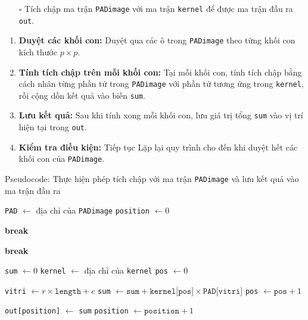 \documentclass{article}
\begin{document}
\begin{itemize}
	\item [$\square$] Tích chập ma trận \texttt{PADimage} với ma trận \texttt{kernel} để được ma trận đầu ra \texttt{out}.
\end{itemize}
\begin{enumerate}
	\item \textbf{Duyệt các khối con:} Duyệt qua các ô trong \texttt{PADimage} theo từng khối con kích thước $p \times p$.
	\item \textbf{Tính tích chập trên mỗi khối con:} Tại mỗi khối con, tính tích chập bằng cách nhân từng phần tử trong \texttt{PADimage} với phần tử tương ứng trong \texttt{kernel}, rồi cộng dồn kết quả vào biến \texttt{sum}.
	\item \textbf{Lưu kết quả:} Sau khi tính xong mỗi khối con, lưu giá trị tổng \texttt{sum} vào vị trí hiện tại trong \texttt{out}. 
	\item \textbf{Kiểm tra điều kiện:} Tiếp tục Lặp lại quy trình cho đến khi duyệt hết các khối con của \texttt{PADimage}.
\end{enumerate}
\begin{algorithm}
	\caption{Pseudocode: Thực hiện phép tích chập với ma trận \texttt{PADimage} và lưu kết quả vào ma trận đầu ra}
	\begin{algorithmic}[1]
		\State \texttt{PAD} $\gets$ địa chỉ của \texttt{PADimage}
		\State \texttt{position} $\gets 0$ 
		
		\State \textbf{break} 
		\EndIf
		
		\State \textbf{break} 
		\EndIf
		
		\State \texttt{sum} $\gets 0$
		\State \texttt{kernel} $\gets$ địa chỉ của \texttt{kernel}
		\State \texttt{pos} $\gets 0$
		
		\State \texttt{vitri} $\gets r \times \texttt{length} + c$ 
		\State \texttt{sum} $\gets \texttt{sum} + \texttt{kernel[pos]} \times \texttt{PAD[vitri]}$
		\EndFor
		\State \texttt{pos} $\gets \texttt{pos} + 1$ 
		\EndFor
		
		\State \texttt{out[position]} $\gets$ \texttt{sum} 
		\State \texttt{position} $\gets \texttt{position} + 1$
		\EndFor
		\EndFor
	\end{algorithmic}
\end{algorithm}
\end{document}
